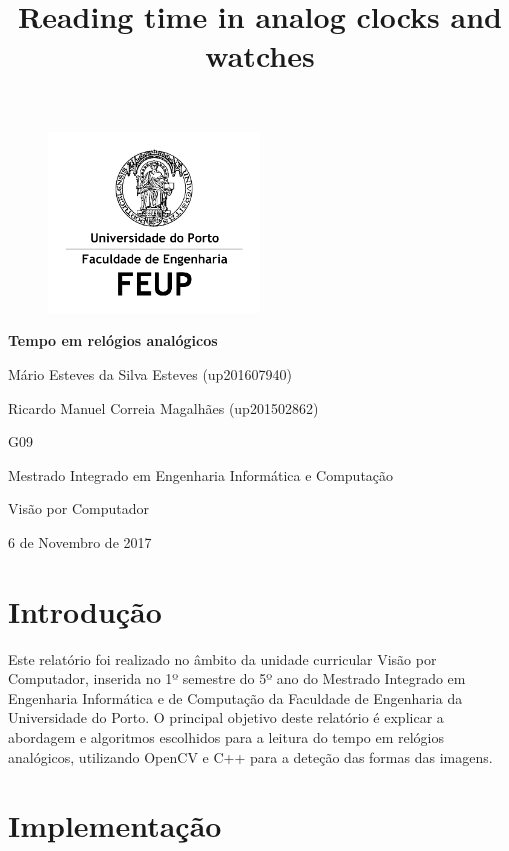 \documentclass[a4paper]{article}
\begin{document}
\title{Reading time in analog clocks and watches}

\begin{titlepage}
  \centering
  \begin{figure}
    \centering
    \includegraphics[width=0.5\textwidth]{FEUP_Logo.png}
  \end{figure}
  \vspace{1.5cm}
  {\huge\bfseries Tempo em relógios analógicos\par}
  \vspace{2cm}    
  Mário Esteves da Silva Esteves (up201607940)\par
  Ricardo Manuel Correia Magalhães (up201502862)\par
  G09
  \vfill
  {\Large Mestrado Integrado em Engenharia Informática e Computação\par}
  \vspace{1cm}
  {\large Visão por Computador\par}
  \vfill
  6 de Novembro de 2017
\end{titlepage}

\renewcommand{\contentsname}{Índice}
\tableofcontents
\newpage

\section{Introdução}

Este relatório foi realizado no âmbito da unidade curricular Visão por Computador, inserida no 1º semestre do 5º ano do Mestrado Integrado em Engenharia Informática e de Computação da Faculdade de Engenharia da Universidade do Porto. O principal objetivo deste relatório é explicar a abordagem e algoritmos escolhidos para a leitura do tempo em relógios analógicos, utilizando OpenCV e C++ para a deteção das formas das imagens.

\newpage
\section{Implementação}
\end{document}
